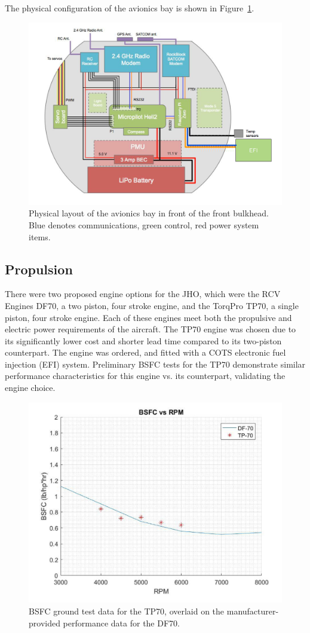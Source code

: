 \documentclass[journal]{aiaa-tc}%
\begin{document}
The physical configuration of the avionics bay is shown in Figure~\ref{f:avbay}.

\begin{figure}
	\begin{center}
		\includegraphics[width=.5\linewidth]{avbay.png}
		\caption{Physical layout of the avionics bay in front of the front bulkhead. Blue denotes communications, green control, red power system items.}
		\label{f:avbay}
	\end{center}
\end{figure}

\subsection{Propulsion}
\label{a:propulsion}

There were two proposed engine options for the JHO, which were the RCV Engines DF70, a two piston, four stroke engine, and the TorqPro TP70, a single piston, four stroke engine. Each of these engines meet both the propulsive and electric power requirements of the aircraft. The TP70 engine was chosen due to its significantly lower cost and shorter lead time compared to its two-piston counterpart. The engine was ordered, and fitted with a COTS electronic fuel injection (EFI) system. Preliminary BSFC tests for the TP70 demonstrate similar performance characteristics for this engine vs. its counterpart, validating the engine choice. 

\begin{figure}
	\centering
	\includegraphics[width=.5\linewidth]{BSFCvalidation.png}
	\caption{BSFC ground test data for the TP70, overlaid on the manufacturer-provided performance data for the DF70.}
	\label{f:BSFCvalidation}
\end{figure}
\end{document}
